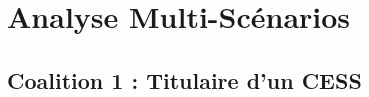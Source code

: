 \section{Analyse Multi-Scénarios}\label{sec:scénarios}
\subsection{Coalition 1 : Titulaire d'un CESS}\label{subsec:coalition1}